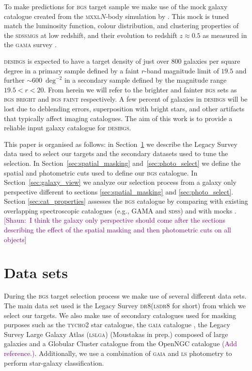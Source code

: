 \documentclass[fleqn,usenatbib]{mnras}
\newcommand{\shaun}[1]{~\newline\noindent \textcolor{Purple}{{ [Shaun:~{#1}]\\}}}
\newcommand{\BGSB}{\textsc{bgs bright}\xspace}
\newcommand{\BGSF}{\textsc{bgs faint}\xspace}
\newcommand{\BGS}{\textsc{bgs}\xspace}
\newcommand{\DESI}{\textsc{desi}\xspace}
\newcommand{\DReight}{\textsc{dr8}\xspace}
\newcommand{\GAMA}{\textsc{gama}\xspace}
\newcommand{\GAIA}{\textsc{gaia}\xspace}
\newcommand{\LS}{\textsc{ls}\xspace}
\newcommand{\LSLGA}{\textsc{lslga}\xspace}
\newcommand{\MGS}{\textsc{mgs}\xspace}
\newcommand{\MXXL}{\textsc{mxxl}\xspace}
\newcommand{\SDSS}{\textsc{sdss}\xspace}
\newcommand{\TYCHO}{\textsc{tycho2}\xspace}
\newcommand{\addref}{\textcolor{purple}{(Add reference.)}}
\begin{document}
To make predictions for \BGS target sample 
we make use of the mock galaxy catalogue created 
from the \MXXL $N$-body simulation  \citep{Angulo2012} by
\cite{Smith:2017tzz}. This mock is tuned match the
 luminosity function,
colour distribution, and clustering properties of the
\SDSS \MGS at low redshift, and their evolution to redshift $z \approx 0.5$ as measured in the \GAMA survey
\citep{2015MNRAS.452.2087L}.

\DESI \BGS is expected to have a target density of just over $800$ galaxies per square degree in a primary sample defined by a faint $r$-band magnitude limit of $19.5$ and further $\sim 600$~$\textrm{deg}^{-2}$ in a secondary sample defined by the magnitude range $19.5 < r < 20$. From herein we will refer to the brighter and fainter \BGS sets as \BGSB and \BGSF respectively. A few percent of galaxies in \DESI \BGS will be lost due to deblending errors, superposition with bright stars, and other artifacts that typically affect imaging catalogues. The aim of this work is to provide a reliable input galaxy catalogue for \DESI \BGS. 



This paper is organised as follows: in Section~\ref{sec:data_sets} we describe the Legacy Survey data used to select our targets and the secondary datasets used to tune the selection. In Section~\ref{sec:spatial_masking} and~\ref{sec:photo_select} we define the spatial and photometric cuts used to define our \BGS catalogue. In Section~\ref{sec:galaxy_view} we analyze our selection process from a galaxy only perspective different to sections \ref{sec:spatial_masking} and \ref{sec:photo_select}. Section \ref{sec:cat_properties} assesses the \BGS catalogue by comparing with existing overlapping spectroscopic catalogues (e.g., GAMA and \SDSS) and with mocks \citep{Smith:2017tzz}.
\shaun{I think the galaxy only perspective should come after the sections 
describing the effect of the spatial masking and then photometric cuts on all objects}

\section{Data sets}\label{sec:data_sets}


During the \BGS target selection process we make use of several different data sets. The main data set used is the Legacy Survey \DReight (\LS \DReight for short) from which we select our targets. We also make use of secondary catalogues used for masking purposes such as the \TYCHO \citep{2000A&A...355L..27H} star catalogue, 
 the \GAIA catalogue \citep{2016A&A...595A...1G},
the Legacy Survey Large Galaxy Atlas (\LSLGA) (Moustakas in prep.) composed of large galaxies and a Globular Cluster catalogue from the OpenNGC catalogue \addref. Additionally, we use a combination of
\GAIA  and \LS photometry to perform star-galaxy classification.
\end{document}

